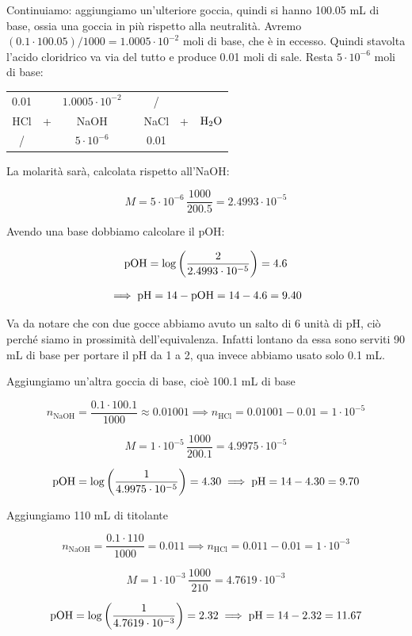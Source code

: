 Continuiamo: aggiungiamo un'ulteriore goccia, quindi si hanno 100.05 mL di base, ossia una goccia in più rispetto alla neutralità. Avremo $(0.1 \cdot 100.05)/1000=1.0005 \cdot 10^{-2}$ moli di base, che è in eccesso. Quindi stavolta l'acido cloridrico va via del tutto e produce 0.01 moli di sale. Resta $5 \cdot 10^{-6}$ moli di base:

\begin{center}
    \begin{tabular}{ccccccc}
        0.01 &  & $1.0005 \cdot 10^{-2}$ & & / & &\\
        HCl & + & NaOH & \ce{->} & NaCl & + & $\rm H_2O$\\
        / &  &  $5 \cdot 10^{-6}$ & & 0.01 & &\\
    \end{tabular}
\end{center}

La molarità sarà, calcolata rispetto all'NaOH:

$$M=5 \cdot 10^{-6} \, \frac{1000}{200.5}=2.4993 \cdot 10^{-5}$$

Avendo una base dobbiamo calcolare il pOH:

$$\rm pOH = \log \left( \frac{2}{2.4993 \cdot 10^{-5}} \right)=4.6$$

$$\implies \rm pH=14 - pOH=14-4.6=9.40$$

Va da notare che con due gocce abbiamo avuto un salto di 6 unità di pH, ciò perché siamo in prossimità dell'equivalenza. Infatti lontano da essa sono serviti 90 mL di base per portare il pH da 1 a 2, qua invece abbiamo usato solo 0.1 mL.

Aggiungiamo un'altra goccia di base, cioè 100.1 mL di base

$$n_{\text{NaOH}}=\frac{0.1 \cdot 100.1}{1000}\approx 0.01001\implies n_{\text{HCl}}=0.01001-0.01 = 1 \cdot 10^{-5}$$

$$M=1 \cdot 10^{-5} \, \frac{1000}{200.1}=4.9975 \cdot 10^{-5}$$

$$\rm pOH=\log \left( \frac{1}{4.9975 \cdot 10^{-5}} \right)=4.30 \implies \rm pH=14-4.30=9.70$$

Aggiungiamo 110 mL di titolante

$$n_{\text{NaOH}}=\frac{0.1 \cdot 110}{1000}= 0.011\implies n_{\text{HCl}}=0.011-0.01 = 1 \cdot 10^{-3}$$

$$M=1 \cdot 10^{-3} \, \frac{1000}{210}=4.7619 \cdot 10^{-3}$$

$$\rm pOH=\log \left( \frac{1}{4.7619 \cdot 10^{-3}} \right)=2.32 \implies \rm pH=14-2.32=11.67$$


